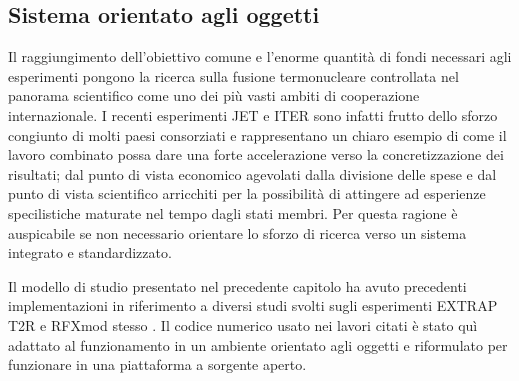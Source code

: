 
\subsection{Sistema orientato agli oggetti}
Il raggiungimento dell'obiettivo comune e l'enorme quantità di fondi
necessari agli esperimenti pongono la ricerca sulla fusione
termonucleare controllata nel panorama scientifico come uno dei più
vasti ambiti di cooperazione internazionale.  I recenti esperimenti JET
e ITER sono infatti frutto dello sforzo congiunto di molti paesi
consorziati e rappresentano un chiaro esempio di come il lavoro
combinato possa dare una forte accelerazione verso la concretizzazione
dei risultati; dal punto di vista economico agevolati dalla divisione
delle spese e dal punto di vista scientifico arricchiti per la
possibilità di attingere ad esperienze specilistiche maturate nel tempo
dagli stati membri. Per questa ragione è auspicabile se non necessario
orientare lo sforzo di ricerca verso un sistema integrato e standardizzato.

Il modello di studio presentato nel precedente capitolo ha avuto
precedenti implementazioni in riferimento a diversi studi svolti sugli
esperimenti EXTRAP T2R \cite{gregoratto} e RFXmod stesso
\cite{pizzimenti}. Il codice numerico usato nei lavori citati è stato
quì adattato al funzionamento in un ambiente orientato agli oggetti e
riformulato per funzionare in una piattaforma a sorgente aperto.

